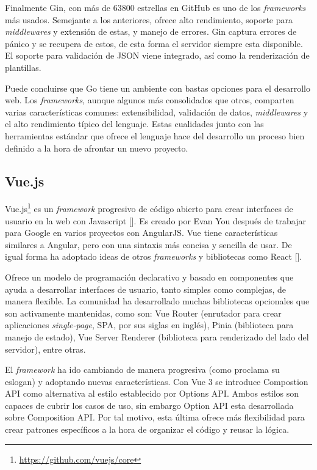 Finalmente Gin, con más de 63800 estrellas en GitHub es uno de los \textit{frameworks} más usados. Semejante a los anteriores, ofrece alto rendimiento, soporte para \textit{middlewares} y extensión de estas, y manejo de errores. Gin captura errores  de pánico y se recupera de estos, de esta forma el servidor siempre esta disponible. El soporte para validación de JSON viene integrado, así como la renderización de plantillas.

Puede concluirse que Go tiene un ambiente con bastas opciones para el desarrollo web. Los \textit{frameworks}, aunque algunos más consolidados que otros, comparten varias características comunes: extensibilidad, validación de datos, \textit{middlewares} y el alto rendimiento típico del lenguaje. Estas cualidades junto con las herramientas estándar que ofrece el lenguaje hace del desarrollo un proceso bien definido a la hora de afrontar un nuevo proyecto.

\subsection{Vue.js}

Vue.js\footnote{\url{https://github.com/vuejs/core}} es un \textit{framework} progresivo de código abierto para crear interfaces de usuario en la web con Javascript [\cite{vue-docs}]. Es creado por Evan You después de trabajar para Google en varios proyectos con AngularJS. Vue tiene características similares a Angular, pero con una sintaxis más concisa y sencilla de usar. De igual forma ha adoptado ideas de otros \textit{frameworks} y bibliotecas como React [\cite{ui-vue}].

Ofrece un modelo de programación declarativo y basado en componentes que ayuda a desarrollar interfaces de usuario, tanto simples como complejas, de manera flexible. La comunidad ha desarrollado muchas bibliotecas opcionales que son activamente mantenidas, como son: Vue Router (enrutador para crear aplicaciones \textit{single-page}, SPA, por sus siglas en inglés), Pinia (biblioteca para manejo de estado), Vue Server Renderer (biblioteca para renderizado del lado del servidor), entre otras.

El \textit{framework} ha ido cambiando de manera progresiva (como proclama su eslogan) y adoptando nuevas características. Con Vue 3 se introduce Compostion API como alternativa al estilo establecido por Options API. Ambos estilos son capaces de cubrir los casos de uso, sin embargo Option API esta desarrollada sobre Composition API. Por tal motivo, esta última ofrece más flexibilidad para crear patrones específicos a la hora de organizar el código y reusar la lógica.

